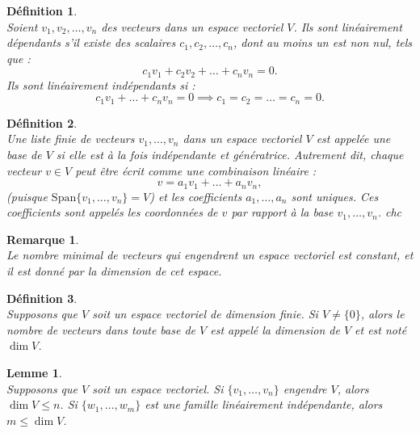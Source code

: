 \documentclass[a4paper, 14pt]{report}
\newtheorem{definition}{Définition}[section]
\newtheorem{remark}{Remarque}[section]
\newtheorem{lemma}{Lemme}
\begin{document}
\begin{onehalfspace}
{			
			\begin{definition} \cite{lang2012algebra} \\
				Soient \( v_1, v_2, \dots, v_n \) des vecteurs dans un espace vectoriel \( V \). Ils sont linéairement dépendants s'il existe des scalaires \( c_1, c_2, \dots, c_n \), dont au moins un est non nul, tels que :
				\[
				c_1 v_1 + c_2 v_2 + \dots + c_n v_n = 0.
				\]
				Ils sont linéairement indépendants si :
				\[
				c_1 v_1 + \dots + c_n v_n = 0 \implies c_1 = c_2 = \dots = c_n = 0.
				\]
			\end{definition}
			
			
			
			\begin{definition} \cite{lang2012algebra} \\
				Une liste finie de vecteurs \( v_1, \dots, v_n \) dans un espace vectoriel \( V \) est appelée une base de \( V \) si elle est à la fois indépendante et génératrice. Autrement dit, chaque vecteur \( v \in V \) peut être écrit comme une combinaison linéaire :
				\[
				v = a_1 v_1 + \dots + a_n v_n,
				\]
				(puisque \( \text{Span}\{v_1, \dots, v_n\} = V \)) et les coefficients \( a_1, \dots, a_n \) sont uniques. Ces coefficients sont appelés les coordonnées de \( v \) par rapport à la base \( v_1, \dots, v_n \).
				chc\end{definition}
			
			\begin{remark} \cite{lang2012algebra}\\
				Le nombre minimal de vecteurs qui engendrent un espace vectoriel est constant, et il est donné par la dimension de cet espace.
			\end{remark}
			
			\begin{definition} \cite{lang2012algebra} \\
				Supposons que \( V \) soit un espace vectoriel de dimension finie. Si \( V \neq \{0\} \), alors le nombre de vecteurs dans toute base de \( V \) est appelé la dimension de \( V \) et est noté \( \dim V \).
			\end{definition}
			
			
			\begin{lemma} \cite{lang2012algebra} \\
				Supposons que \( V \) soit un espace vectoriel. Si \( \{v_1, \dots, v_n\} \) engendre \( V \), alors \( \dim V \leq n \). Si \( \{w_1, \dots, w_m\} \) est une famille linéairement indépendante, alors \( m \leq \dim V \).
			\end{lemma}
			
}
\end{onehalfspace}
\end{document}
